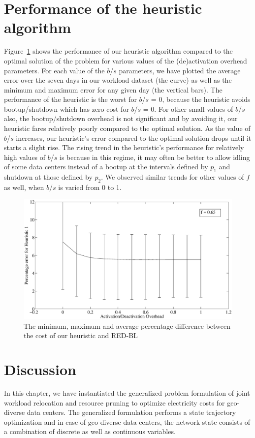 \section{Performance of the heuristic algorithm}
Figure~\ref{fig:heur1perf} shows the performance of our heuristic algorithm compared to the optimal solution of the problem for various values of the (de)activation overhead parameters. For each value of the $b$/$s$ parameters, we have plotted the average error over the seven days in our workload dataset (the curve) as well as the minimum and maximum error for any given day (the vertical bars). The performance of the heuristic is the worst for $b$/$s$ = 0, because the heuristic avoids bootup/shutdown which has zero cost for $b$/$s$ = 0. For other small values of $b$/$s$ also, the bootup/shutdown overhead is not significant and by avoiding it, our heuristic fares relatively poorly compared to the optimal solution. As the value of $b$/$s$ increases, our heuristic's error compared to the optimal solution drops until it starts a slight rise. The rising trend in the heuristic's performance for relatively high values of $b$/$s$ is because in this regime, it may often be better to allow idling of some data centers instead of a bootup at the intervals defined by $p_1$ and shutdown at those defined by $p_2$. We observed similar trends for other values of $f$ as well, when $b$/$s$ is varied from 0 to 1.

\begin{figure}
\includegraphics[width=1\linewidth]{pics/rb-heur1error.eps}
\caption{The minimum, maximum and average percentage difference between the cost of our heuristic and RED-BL}
\label{fig:heur1perf}
\end{figure}

\section{Discussion}
In this chapter, we have instantiated the generalized problem formulation of joint workload relocation and resource pruning to optimize electricity costs for geo-diverse data centers. The generalized formulation performs a state trajectory optimization and in case of geo-diverse data centers, the network state consists of a combination of discrete as well as continuous variables. 

